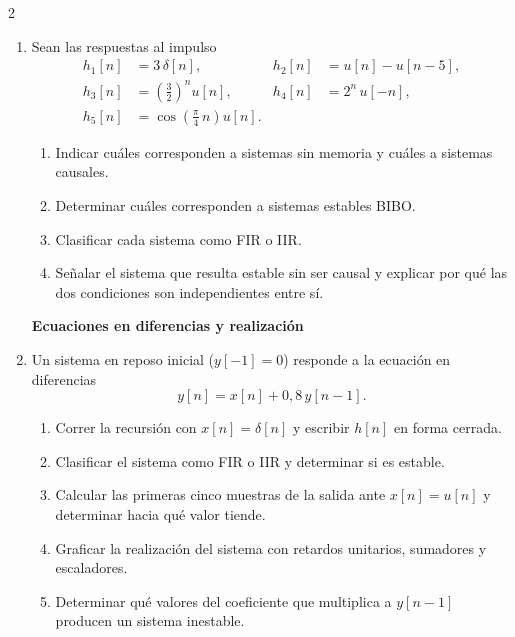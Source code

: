 \documentclass[10pt,a4paper]{article}
\begin{document}
\begin{multicols}{2}
\begin{enumerate}
		\textbf{Propiedades leídas en $h[n]$}

		\item Sean las respuestas al impulso
		\begin{align*}
			h_1[n] &= 3\,\delta[n], &
			h_2[n] &= u[n]-u[n-5], \\
			h_3[n] &= \left(\tfrac{3}{2}\right)^{\!n} u[n], &
			h_4[n] &= 2^{n}\,u[-n], \\
			h_5[n] &= \cos\!\left(\tfrac{\pi}{4}\,n\right) u[n]. &
		\end{align*}
		\begin{enumerate}
			\item Indicar cuáles corresponden a sistemas sin memoria y cuáles
			a sistemas causales.
			\item Determinar cuáles corresponden a sistemas estables BIBO.
			\item Clasificar cada sistema como FIR o IIR.
			\item Señalar el sistema que resulta estable sin ser causal y
			explicar por qué las dos condiciones son independientes entre sí.
		\end{enumerate}

		\textbf{Ecuaciones en diferencias y realización}

		\item Un sistema en reposo inicial ($y[-1]=0$) responde a la
		ecuación en diferencias
		\[
			y[n] = x[n] + 0{,}8\,y[n-1].
		\]
		\begin{enumerate}
			\item Correr la recursión con $x[n]=\delta[n]$ y escribir $h[n]$
			en forma cerrada.
			\item Clasificar el sistema como FIR o IIR y determinar si es
			estable.
			\item Calcular las primeras cinco muestras de la salida ante
			$x[n]=u[n]$ y determinar hacia qué valor tiende.
			\item Graficar la realización del sistema con retardos unitarios,
			sumadores y escaladores.
			\item Determinar qué valores del coeficiente que multiplica a
			$y[n-1]$ producen un sistema inestable.
		\end{enumerate}


\end{enumerate}
\end{multicols}
\end{document}
